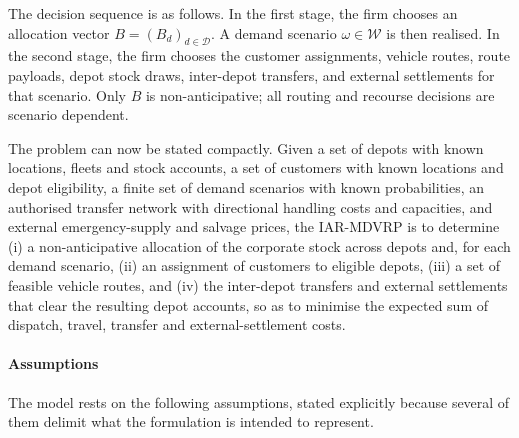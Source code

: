 \documentclass[authoryear,final,3p,times]{elsarticle}
\theoremstyle{definition}
\theoremstyle{plain}
\begin{document}
The decision sequence is as follows.  In the first stage, the firm chooses an
allocation vector $B=(B_d)_{d\in\mathcal D}$.  A demand scenario
$\omega\in\mathcal W$ is then realised.  In the second stage, the firm chooses
the customer assignments, vehicle routes, route payloads, depot stock draws,
inter-depot transfers, and external settlements for that scenario.  Only $B$ is
non-anticipative; all routing and recourse decisions are scenario dependent.

The problem can now be stated compactly.  Given a set of depots with known
locations, fleets and stock accounts, a set of customers with known locations
and depot eligibility, a finite set of demand scenarios with known
probabilities, an authorised transfer network with directional handling costs
and capacities, and external emergency-supply and salvage prices, the
IAR-MDVRP is to determine (i) a non-anticipative allocation of the corporate
stock across depots and, for each demand scenario, (ii) an assignment of
customers to eligible depots, (iii) a set of feasible vehicle routes, and
(iv) the inter-depot transfers and external settlements that clear the
resulting depot accounts, so as to minimise the expected sum of dispatch,
travel, transfer and external-settlement costs.

\paragraph{Assumptions}
The model rests on the following assumptions, stated explicitly because
several of them delimit what the formulation is intended to represent.
\end{document}
